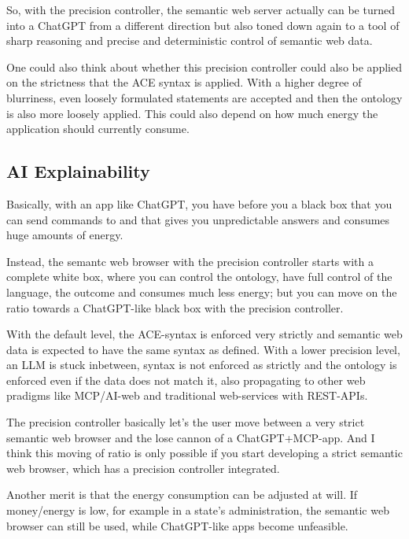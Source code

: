 \documentclass[12pt,a4paper]{article}
\begin{document}
So, with the precision controller, the semantic web server actually can be turned into a ChatGPT from a different direction but also toned down again to a tool of sharp reasoning and precise and deterministic control of semantic web data.

One could also think about whether this precision controller could also be applied on the strictness that the ACE syntax is applied. With a higher degree of blurriness, even loosely formulated statements are accepted and then the ontology is also more loosely applied. This could also depend on how much energy the application should currently consume.

\subsection{AI Explainability}

Basically, with an app like ChatGPT, you have before you a black box that you can send commands to and that gives you unpredictable answers and consumes huge amounts of energy.

Instead, the semantc web browser with the precision controller starts with a complete white box, where you can control the ontology, have full control of the language, the outcome and consumes much less energy; but you can move on the ratio towards a ChatGPT-like black box with the precision controller.

With the default level, the ACE-syntax is enforced very strictly and semantic web data is expected to have the same syntax as defined. With a lower precision level, an LLM is stuck inbetween, syntax is not enforced as strictly and the ontology is enforced even if the data does not match it, also propagating to other web pradigms like MCP/AI-web and traditional web-services with REST-APIs.

The precision controller basically let's the user move between a very strict semantic web browser and the lose cannon of a ChatGPT+MCP-app. And I think this moving of ratio is only possible if you start developing a strict semantic web browser, which has a precision controller integrated.

Another merit is that the energy consumption can be adjusted at will. If money/energy is low, for example in a state's administration, the semantic web browser can still be used, while ChatGPT-like apps become unfeasible.
\end{document}

